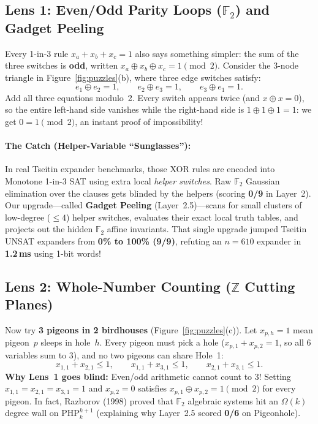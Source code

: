 \documentclass[11pt]{article}
\begin{document}
\subsection{Lens 1: Even/Odd Parity Loops ($\mathbb{F}_2$) and Gadget Peeling}

Every 1-in-3 rule $x_a + x_b + x_c = 1$ also says something simpler: the sum of the three switches is \textbf{odd}, written $x_a \oplus x_b \oplus x_c = 1 \pmod 2$. Consider the 3-node triangle in Figure~\ref{fig:puzzles}(b), where three edge switches satisfy:
\[
e_1 \oplus e_2 = 1, \qquad e_2 \oplus e_3 = 1, \qquad e_3 \oplus e_1 = 1.
\]
Add all three equations modulo~2. Every switch appears twice (and $x \oplus x = 0$), so the entire left-hand side vanishes while the right-hand side is $1 \oplus 1 \oplus 1 = 1$: we get $0 = 1 \pmod 2$, an instant proof of impossibility!

\paragraph{The Catch (Helper-Variable ``Sunglasses''):} In real Tseitin expander benchmarks, those XOR rules are encoded into Monotone 1-in-3 SAT using extra local \emph{helper switches}. Raw $\mathbb{F}_2$ Gaussian elimination over the clauses gets blinded by the helpers (scoring \textbf{0/9} in Layer~2). Our upgrade---called \textbf{Gadget Peeling} (Layer~2.5)---scans for small clusters of low-degree ($\le 4$) helper switches, evaluates their exact local truth tables, and projects out the hidden $\mathbb{F}_2$ affine invariants. That single upgrade jumped Tseitin UNSAT expanders from \textbf{0\% to 100\% (9/9)}, refuting an $n = 610$ expander in \textbf{1.2\,ms} using 1-bit words!

\subsection{Lens 2: Whole-Number Counting ($\mathbb{Z}$ Cutting Planes)}

Now try \textbf{3 pigeons in 2 birdhouses} (Figure~\ref{fig:puzzles}(c)). Let $x_{p,h} = 1$ mean pigeon~$p$ sleeps in hole~$h$. Every pigeon must pick a hole ($x_{p,1} + x_{p,2} = 1$, so all 6 variables sum to $3$), and no two pigeons can share Hole~1:
\[
x_{1,1} + x_{2,1} \le 1, \qquad x_{1,1} + x_{3,1} \le 1, \qquad x_{2,1} + x_{3,1} \le 1.
\]
\textbf{Why Lens~1 goes blind:} Even/odd arithmetic cannot count to 3! Setting $x_{1,1} = x_{2,1} = x_{3,1} = 1$ and $x_{p,2} = 0$ satisfies $x_{p,1} \oplus x_{p,2} = 1 \pmod 2$ for every pigeon. In fact, Razborov (1998) proved that $\mathbb{F}_2$ algebraic systems hit an $\Omega(k)$ degree wall on $\mathrm{PHP}_k^{k+1}$ (explaining why Layer~2.5 scored \textbf{0/6} on Pigeonhole).
\end{document}
